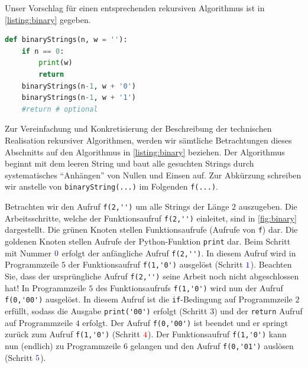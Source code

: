 Unser Vorschlag für einen entsprechenden rekursiven Algorithmus ist in \cref{listing:binary} gegeben.
\begin{lstlisting}[language=Python,caption=binaryStrings,label=listing:binary]
def binaryStrings(n, w = ''):
    if n == 0:
        print(w)
        return
    binaryStrings(n-1, w + '0')
    binaryStrings(n-1, w + '1')
    #return # optional
\end{lstlisting}
Zur Vereinfachung und Konkretisierung der Beschreibung der technischen Realisation rekursiver Algorithmen, werden wir sämtliche Betrachtungen dieses Abschnitts auf den Algorithmus in \cref{listing:binary} beziehen. Der Algorithmus beginnt mit dem leeren String und baut alle gesuchten Strings durch systematisches \enquote{Anhängen} von Nullen und Einsen auf. Zur Abkürzung schreiben wir anstelle von \verb|binaryString(...)| im Folgenden \verb|f(...)|.

\noindent
Betrachten wir den Aufruf \verb|f(2,'')| um alle Strings der Länge $2$ auszugeben. Die Arbeitsschritte, welche der Funktionsaufruf \verb|f(2,'')| einleitet, sind in \cref{fig:binary} dargestellt. Die \textcolor{Green!55}{grünen} Knoten stellen Funktionsaufrufe (Aufrufe von \verb|f|) dar. Die \textcolor{Gold!85}{goldenen} Knoten stellen Aufrufe der Python-Funktion \verb|print| dar. Beim Schritt mit Nummer $\textcolor{Blue}{0}$ erfolgt der anfängliche Aufruf \verb|f(2,'')|. In diesem Aufruf wird in Programmzeile $5$ der Funktionsaufruf \verb|f(1,'0')| ausgelöst (Schritt $\textcolor{Blue}{1}$). Beachten Sie, dass der ursprüngliche Aufruf \verb|f(2,'')| seine Arbeit noch nicht abgeschlossen hat! In Programmzeile $5$ des Funktionsaufrufs \verb|f(1,'0')| wird nun der Aufruf \verb|f(0,'00')| ausgelöst. In diesem Aufruf ist die \verb|if|-Bedingung auf Programmzeile $2$ erfüllt, sodass die Ausgabe \verb|print('00')| erfolgt (Schritt $3$) und der \verb|return| Aufruf auf Programmzeile $4$ erfolgt. Der Aufruf \verb|f(0,'00')| ist beendet und er springt zurück zum Aufruf \verb|f(1,'0')| (Schritt $\textcolor{Red}{4}$). Der Funktionsaufruf \verb|f(1,'0')| kann nun (endlich) zu Programmzeile $6$ gelangen und den Aufruf \verb|f(0,'01')| auslösen (Schritt $\textcolor{Blue}{5}$).

